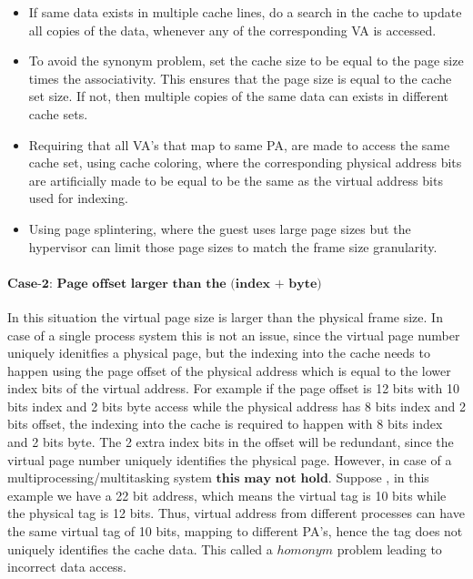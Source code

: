 \documentclass{tufte-handout}
\begin{document}
			\begin{itemize}
				\item If same data exists in multiple cache lines, do a search in the cache to update all copies of the data, whenever any of the corresponding VA is accessed.
				\item To avoid the synonym problem, set the cache size to be equal to the page size times the associativity. This ensures that the page size is equal to the cache set size. If not, then multiple copies of the same data can exists in different cache sets.
				\item Requiring that all VA's that map to same PA, are made to access the same cache set, using cache coloring, where the corresponding physical address bits are artificially made to be equal to be the same as the virtual address bits used for indexing.
				\item Using page splintering, where the guest uses large page sizes but the hypervisor can limit those page sizes to match the frame size granularity.
			\end{itemize}

		\paragraph{$\textbf{Case-2: Page offset larger than the (index + byte)}$}
			In this situation the virtual page size is larger than the physical frame size. In case of a single process system this is not an issue, since  the virtual page number uniquely idenitfies a physical page, but the indexing into the cache needs to happen using the page offset of the physical address which is equal to the lower index bits of the virtual address. For example if the page offset is 12 bits with 10 bits index and 2 bits byte access while the physical address has 8 bits index and 2 bits offset, the indexing into the cache is required to happen with 8 bits index and 2 bits byte. The 2 extra index bits in the offset will be redundant, since the virtual page number uniquely identifies the physical page. However, in case of a multiprocessing/multitasking system $\textbf{this may not hold}$. Suppose , in this example we have a 22 bit address, which means the virtual tag is 10 bits while the physical tag is 12 bits. Thus, virtual address from different processes can have the same virtual tag of 10 bits, mapping to different PA's, hence the tag does not uniquely identifies the cache data. This called a $homonym$ problem leading to incorrect data access.
\end{document}
